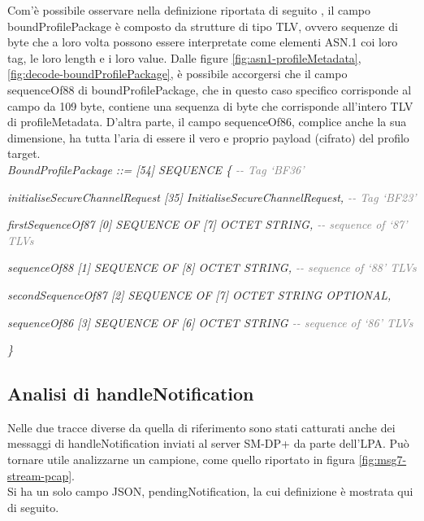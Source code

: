 \documentclass[10pt, oneside]{book}
\begin{document}
Com'è possibile osservare nella definizione riportata di seguito \cite{RSP-definitions}, il campo boundProfilePackage è composto da strutture di tipo TLV, ovvero sequenze di byte che a loro volta possono essere interpretate come elementi ASN.1 coi loro tag, le loro length e i loro value. Dalle figure \ref{fig:asn1-profileMetadata}, \ref{fig:decode-boundProfilePackage}, è possibile accorgersi che il campo sequenceOf88 di boundProfilePackage, che in questo caso specifico corrisponde al campo da 109 byte, contiene una sequenza di byte che corrisponde all'intero TLV di profileMetadata. D'altra parte, il campo sequenceOf86, complice anche la sua dimensione, ha tutta l'aria di essere il vero e proprio payload (cifrato) del profilo target.\\

\textit{BoundProfilePackage ::= [54] SEQUENCE \{ \textcolor{gray}{{-}{-} Tag `BF36'}}

\hspace{0.75cm} \textit{initialiseSecureChannelRequest [35] InitialiseSecureChannelRequest, \textcolor{gray}{{-}{-} Tag `BF23'}}

\hspace{0.75cm} \textit{firstSequenceOf87 [0] SEQUENCE OF [7] OCTET STRING, \textcolor{gray}{{-}{-} sequence of `87' TLVs}}

\hspace{0.75cm} \textit{sequenceOf88 [1] SEQUENCE OF [8] OCTET STRING, \textcolor{gray}{{-}{-} sequence of `88' TLVs}}

\hspace{0.75cm} \textit{secondSequenceOf87 [2] SEQUENCE OF [7] OCTET STRING OPTIONAL,}

\hspace{0.75cm} \textit{sequenceOf86 [3] SEQUENCE OF [6] OCTET STRING \textcolor{gray}{{-}{-} sequence of `86' TLVs}}

\textit{\}\\}

\subsection{Analisi di handleNotification}
Nelle due tracce diverse da quella di riferimento sono stati catturati anche dei messaggi di handleNotification inviati al server SM-DP+ da parte dell'LPA. Può tornare utile analizzarne un campione, come quello riportato in figura \ref{fig:msg7-stream-pcap}.\\
Si ha un solo campo JSON, pendingNotification, la cui definizione è mostrata qui di seguito.\\
\end{document}
